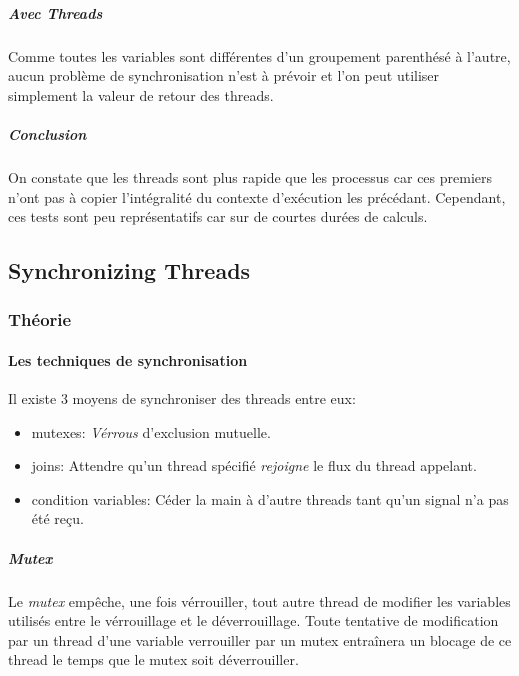 \documentclass[a4paper, 12pt]{article}
\begin{document}

\subparagraph{Avec Threads\\}

Comme toutes les variables sont différentes d'un groupement parenthésé à l'autre, aucun problème de synchronisation n'est à prévoir et l'on peut utiliser simplement la valeur de retour des threads.




\subparagraph{Conclusion\\}

On constate que les threads sont plus rapide que les processus car ces premiers n'ont pas à copier l'intégralité du contexte d'exécution les précédant. Cependant, ces tests sont peu représentatifs car sur de courtes durées de calculs.

\subsection{Synchronizing Threads}

\subsubsection{Théorie}

\paragraph{Les techniques de synchronisation\\}

Il existe 3 moyens de synchroniser des threads entre eux:
\begin{itemize}
	\item mutexes: \emph{Vérrous} d'exclusion mutuelle. 
	
	\item joins: Attendre qu'un thread spécifié \emph{rejoigne} le flux du thread appelant. 

	\item condition variables: Céder la main à d'autre threads tant qu'un signal n'a pas été reçu.

\end{itemize}

\subparagraph{Mutex\\}

Le \emph{mutex} empêche, une fois vérrouiller, tout autre thread de modifier les variables utilisés entre le vérrouillage et le déverrouillage.
	Toute tentative de modification par un thread d'une variable verrouiller par un mutex entraînera un blocage de ce thread le temps que le mutex soit déverrouiller.
	
\end{document}
